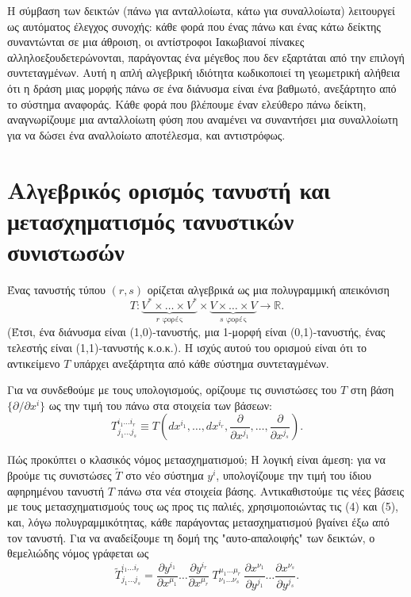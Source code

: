 \documentclass[12pt]{article}
\begin{document}
Η σύμβαση των δεικτών (πάνω για ανταλλοίωτα, κάτω για συναλλοίωτα) λειτουργεί ως αυτόματος έλεγχος συνοχής: κάθε φορά που ένας πάνω και ένας κάτω δείκτης συναντώνται σε μια άθροιση, οι αντίστροφοι Ιακωβιανοί πίνακες αλληλοεξουδετερώνονται, παράγοντας ένα μέγεθος που δεν εξαρτάται από την επιλογή συντεταγμένων. Αυτή η απλή αλγεβρική ιδιότητα κωδικοποιεί τη γεωμετρική αλήθεια ότι η δράση μιας μορφής πάνω σε ένα διάνυσμα είναι ένα βαθμωτό, ανεξάρτητο από το σύστημα αναφοράς. Κάθε φορά που βλέπουμε έναν ελεύθερο πάνω δείκτη, αναγνωρίζουμε μια ανταλλοίωτη φύση που αναμένει να συναντήσει μια συναλλοίωτη για να δώσει ένα αναλλοίωτο αποτέλεσμα, και αντιστρόφως.

\section{Αλγεβρικός ορισμός τανυστή και μετασχηματισμός τανυστικών συνιστωσών}

Ένας τανυστής τύπου \( (r, s) \) ορίζεται αλγεβρικά ως μια πολυγραμμική απεικόνιση
\[
T: \underbrace{V^* \times \dots \times V^*}_{r \text{ φορές}} \times \underbrace{V \times \dots \times V}_{s \text{ φορές}} \to \mathbb{R}. \tag{8}
\]
(Έτσι, ένα διάνυσμα είναι (1,0)-τανυστής, μια 1-μορφή είναι (0,1)-τανυστής, ένας τελεστής είναι (1,1)-τανυστής κ.ο.κ.). Η ισχύς αυτού του ορισμού είναι ότι το αντικείμενο \( T \) υπάρχει ανεξάρτητα από κάθε σύστημα συντεταγμένων.

Για να συνδεθούμε με τους υπολογισμούς, ορίζουμε τις συνιστώσες του \( T \) στη βάση \( \{ \partial / \partial x^i \} \) ως την τιμή του πάνω στα στοιχεία των βάσεων:
\[
T^{i_1 \dots i_r}_{j_1 \dots j_s} \equiv T\left( dx^{i_1}, \dots, dx^{i_r}, \frac{\partial}{\partial x^{j_1}}, \dots, \frac{\partial}{\partial x^{j_s}} \right). \tag{9}
\]

Πώς προκύπτει ο κλασικός νόμος μετασχηματισμού; Η λογική είναι άμεση: για να βρούμε τις συνιστώσες \( \tilde{T} \) στο νέο σύστημα \( y^i \), υπολογίζουμε την τιμή του ίδιου αφηρημένου τανυστή \( T \) πάνω στα νέα στοιχεία βάσης. Αντικαθιστούμε τις νέες βάσεις με τους μετασχηματισμούς τους ως προς τις παλιές, χρησιμοποιώντας τις (4) και (5), και, λόγω πολυγραμμικότητας, κάθε παράγοντας μετασχηματισμού βγαίνει έξω από τον τανυστή. Για να αναδείξουμε τη δομή της "αυτο-απαλοιφής" των δεικτών, ο θεμελιώδης νόμος γράφεται ως
\[
\tilde{T}^{i_1 \dots i_r}_{j_1 \dots j_s} = \frac{\partial y^{i_1}}{\partial x^{\mu_1}} \dots \frac{\partial y^{i_r}}{\partial x^{\mu_r}} \ T^{\mu_1 \dots \mu_r}_{\nu_1 \dots \nu_s} \ \frac{\partial x^{\nu_1}}{\partial y^{j_1}} \dots \frac{\partial x^{\nu_s}}{\partial y^{j_s}}. \tag{10}
\]
\end{document}
